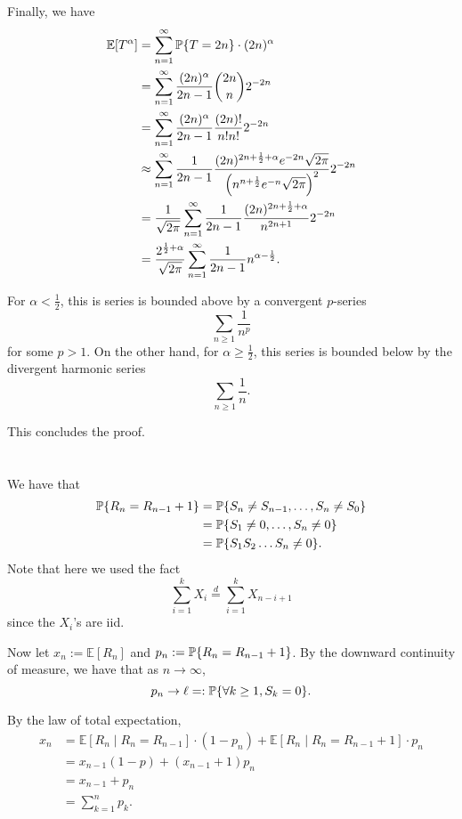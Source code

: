 \documentclass[10pt]{article}
\DeclarePairedDelimiter{\set}{\lbrace}{\rbrace}
\newcommand{\eq}[1]{\stackrel{#1}{=}}
\newcommand{\E}{\mathbb{E}}
\renewcommand{\P}{\mathbb{P}}
\begin{document}
Finally,
we have
\begin{align*}
  \E[T^\alpha]
  &= \sum_{n=1}^\infty \P\set{T=2n}\cdot (2n)^\alpha \\
  &= \sum_{n=1}^\infty \frac{(2n)^\alpha}{2n-1} \binom{2n}{n} 2^{-2n} \\
  &= \sum_{n=1}^\infty \frac{(2n)^\alpha}{2n-1} \frac{(2n)!}{n!n!} 2^{-2n} \\
  &\approx \sum_{n=1}^\infty \frac1{2n-1} \frac{(2n)^{2n+\frac12+\alpha} e^{-2n} \sqrt{2\pi}}{\left( n^{n+\frac12} e^{-n} \sqrt{2\pi} \right)^2} 2^{-2n} \\
  &= \frac1{\sqrt{2\pi}} \sum_{n=1}^\infty \frac1{2n-1} \frac{(2n)^{2n+\frac12+\alpha}}{n^{2n+1}} 2^{-2n} \\
  &= \frac{2^{\frac12+\alpha}}{\sqrt{2\pi}} \sum_{n=1}^\infty \frac1{2n-1} n^{\alpha-\frac12}.
\end{align*}

For $\alpha < \frac12$,
this is series is bounded above by a convergent $p$-series
\[
  \sum_{n\geq 1} \frac1{n^p}
\]
for some $p > 1$.
On the other hand,
for $\alpha \geq \frac12$,
this series is bounded below by the divergent harmonic series
\[
  \sum_{n\geq 1} \frac1n.
\]

This concludes the proof.

\clearpage
\section{}
We have that
\begin{align*}
  \P\set{R_{n} = R_{n-1} + 1}
  &= \P\set{S_n\neq S_{n-1}, \dots, S_n\neq S_0} \\
  &= \P\set{S_1\neq 0, \dots, S_n\neq 0} \\
  &= \P\set{S_1S_2\dots S_n\neq 0}.
\end{align*}
Note that here we used the fact
\[
  \sum_{i=1}^k X_i \eq{d} \sum_{i=1}^k X_{n-i+1}
\]
since the $X_i$'s are iid.

Now let $x_n := \E[R_n]$ and $p_n := \P\set{R_n = R_{n-1} + 1}$.
By the downward continuity of measure,
we have that as $n\to \infty$,
\[
  p_n\to \ell =: \P\set{\forall k\geq 1, S_k=0}.
\]

By the law of total expectation,
\begin{align*}
  x_n
  &= \E[R_n\mid R_n=R_{n-1}]\cdot (1-p_n) + \E[R_n\mid R_n=R_{n-1}+1]\cdot p_n \\
  &= x_{n-1} (1-p) + (x_{n-1} + 1) p_n \\
  &= x_{n-1} + p_n \\
  &= \sum_{k=1}^n p_k.
\end{align*}
\end{document}
